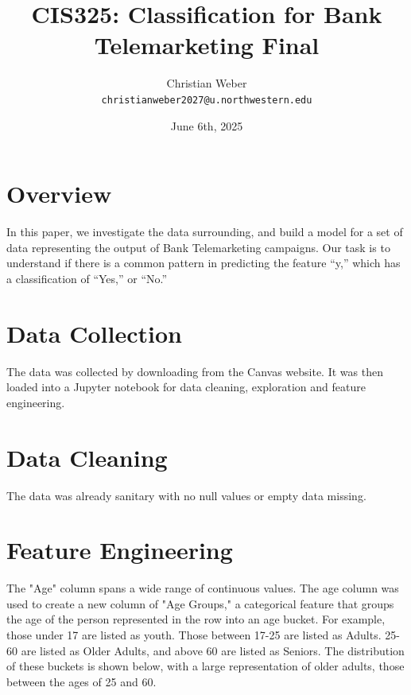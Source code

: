 \documentclass{article}
\begin{document}
\title{CIS325: Classification for Bank Telemarketing Final}
\author{
  Christian Weber\\
  \texttt{christianweber2027@u.northwestern.edu}
}

\date{June 6th, 2025}
\maketitle


\section{Overview}

In this paper, we investigate the data surrounding, and build a model for a set of data representing the output of Bank Telemarketing campaigns. Our task is to understand if there is a common pattern in predicting the feature “y,” which has a classification of “Yes,” or “No.”

\section{Data Collection}

The data was collected by downloading from the Canvas website. It was then loaded into a Jupyter notebook for data cleaning, exploration and feature engineering.

\section{Data Cleaning}

The data was already sanitary with no null values or empty data missing.

\section{Feature Engineering}

The "Age" column spans a wide range of continuous values. The age column was used to create a new column of "Age Groups," a categorical feature that groups the age of the person represented in the row into an age bucket. For example, those under 17 are listed as youth. Those between 17-25 are listed as Adults. 25-60 are listed as Older Adults, and above 60 are listed as Seniors. The distribution of these buckets is shown below, with a large representation of older adults, those between the ages of 25 and 60.
\end{document}
